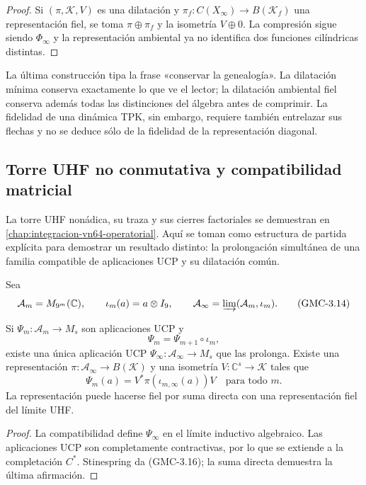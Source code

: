 \begin{proof}
Si $(\pi,\mathcal K,V)$ es una dilatación y
$\pi_f:C(X_\infty)\to B(\mathcal K_f)$ una representación fiel, se toma
$\pi\oplus\pi_f$ y la isometría $V\oplus0$. La compresión sigue siendo
$\Phi_\infty$ y la representación ambiental ya no identifica dos funciones
cilíndricas distintas.
\end{proof}

La última construcción tipa la frase «conservar la genealogía». La
dilatación mínima conserva exactamente lo que ve el lector; la dilatación
ambiental fiel conserva además todas las distinciones del álgebra antes de
comprimir. La fidelidad de una dinámica TPK, sin embargo, requiere también
entrelazar sus flechas y no se deduce sólo de la fidelidad de la
representación diagonal.

\subsection{Torre UHF no conmutativa y compatibilidad matricial}

La torre UHF nonádica, su traza y sus cierres factoriales se demuestran en
\cref{chap:integracion-vn64-operatorial}. Aquí se toman como estructura de
partida explícita para demostrar un resultado distinto: la prolongación
simultánea de una familia compatible de aplicaciones UCP y su dilatación
común.

Sea
\[
 \mathcal A_m=M_{9^m}(\mathbb C),
 \qquad \iota_m(a)=a\otimes I_9,
 \qquad
 \mathcal A_\infty=\varinjlim(\mathcal A_m,\iota_m).
 \tag{GMC-3.14}
\]

\begin{theorem}
\label{p12-83-c22-s4:gmc:thm:dilatacion-uhf}
Si $\Psi_m:\mathcal A_m\to M_s$ son aplicaciones UCP y
\[
 \Psi_m=\Psi_{m+1}\circ\iota_m,
 \tag{GMC-3.15}
\]
existe una única aplicación UCP
$\Psi_\infty:\mathcal A_\infty\to M_s$ que las prolonga. Existe una
representación $\pi:\mathcal A_\infty\to B(\mathcal K)$ y una isometría
$V:\mathbb C^s\to\mathcal K$ tales que
\[
 \Psi_m(a)=V^*\pi(\iota_{m,\infty}(a))V
 \quad\text{para todo }m.
 \tag{GMC-3.16}
\]
La representación puede hacerse fiel por suma directa con una representación
fiel del límite UHF.
\end{theorem}

\begin{proof}
La compatibilidad define $\Psi_\infty$ en el límite inductivo algebraico. Las
aplicaciones UCP son completamente contractivas, por lo que se extiende a la
completación $C^*$. Stinespring da \textup{(GMC-3.16)}; la suma directa demuestra la
última afirmación.
\end{proof}


